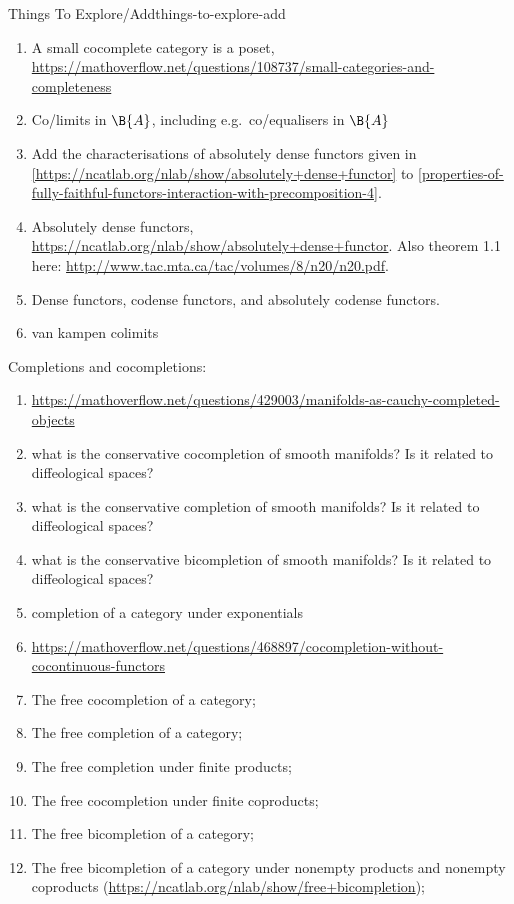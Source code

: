 \begin{remark}{Things To Explore/Add}{things-to-explore-add}
\begin{enumerate}
        \item A small cocomplete category is a poset, \url{https://mathoverflow.net/questions/108737/small-categories-and-completeness}
        \item Co/limits in $\B{A}$, including e.g.\ co/equalisers in $\B{A}$
        \item Add the characterisations of absolutely dense functors given in \cref{https://ncatlab.org/nlab/show/absolutely+dense+functor} to \cref{properties-of-fully-faithful-functors-interaction-with-precomposition-4}.
        \item Absolutely dense functors, \url{https://ncatlab.org/nlab/show/absolutely+dense+functor}. Also theorem 1.1 here: \url{http://www.tac.mta.ca/tac/volumes/8/n20/n20.pdf}.
        \item Dense functors, codense functors, and absolutely codense functors.
        \item van kampen colimits
    \end{enumerate}
    Completions and cocompletions:
    \begin{enumerate}
        \item \url{https://mathoverflow.net/questions/429003/manifolds-as-cauchy-completed-objects}
        \item what is the conservative cocompletion of smooth manifolds? Is it related to diffeological spaces?
        \item what is the conservative completion of smooth manifolds? Is it related to diffeological spaces?
        \item what is the conservative bicompletion of smooth manifolds? Is it related to diffeological spaces?
        \item completion of a category under exponentials
        \item \url{https://mathoverflow.net/questions/468897/cocompletion-without-cocontinuous-functors}
        \item The free cocompletion of a category;
        \item The free completion of a category;
        \item The free completion under finite products;
        \item The free cocompletion under finite coproducts;
        \item The free bicompletion of a category;
        \item The free bicompletion of a category under nonempty products and nonempty coproducts (\url{https://ncatlab.org/nlab/show/free+bicompletion});

\end{enumerate}
\end{remark}
